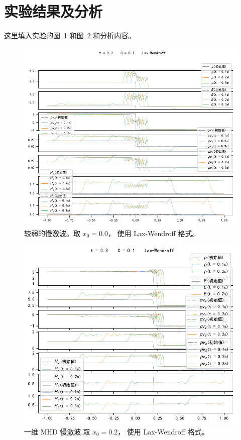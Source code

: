 \documentclass[10.5pt
]{article}
\begin{document}
\section{实验结果及分析}
这里填入实验的图~\ref{fig:lax_wendroff2} 和图~\ref{fig:lax_wendroff4} 和分析内容。

\begin{figure}[htpb]
	\centering
	\includegraphics{figures/init2.pdf}
	\caption{较弱的慢激波。取 \(x_0 = 0.0，\) 使用 Lax-Wendroff 格式。}%
	\label{fig:lax_wendroff2}
\end{figure}

\begin{figure}[htpb]
	\centering
	\includegraphics{figures/init4.pdf}
	\caption{一维 MHD 慢激波.取 \(x_0 = 0.2，\) 使用 Lax-Wendroff 格式。}%
	\label{fig:lax_wendroff4}
\end{figure}
\end{document}
